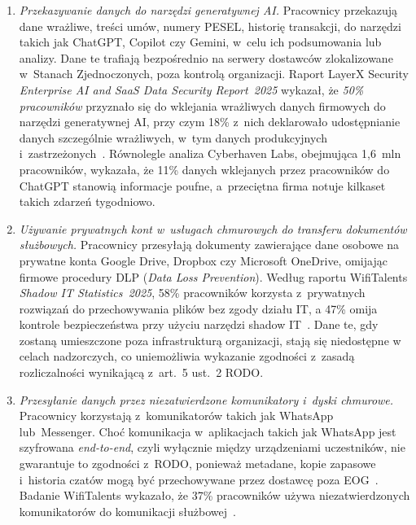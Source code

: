 \begin{enumerate}[label=(\roman*)]

\item \textit{Przekazywanie danych do narzędzi generatywnej AI.}
Pracownicy przekazują dane wrażliwe, treści umów, numery PESEL,
historię transakcji,  do narzędzi takich jak ChatGPT, Copilot czy Gemini,
w~celu ich podsumowania lub analizy. Dane te trafiają bezpośrednio na serwery
dostawców zlokalizowane w~Stanach Zjednoczonych, poza kontrolą organizacji.
Raport LayerX Security \textit{Enterprise AI and SaaS Data Security Report~2025}
wykazał, że \textit{50\% pracowników} przyznało się do wklejania wrażliwych
danych firmowych do narzędzi generatywnej AI, przy czym 18\% z~nich
deklarowało udostępnianie danych szczególnie wrażliwych, w~tym danych produkcyjnych
i~zastrzeżonych~\autocite{layerx_2025}. Równolegle analiza Cyberhaven Labs,
obejmująca 1,6~mln pracowników, wykazała, że 11\% danych
wklejanych przez pracowników do ChatGPT stanowią informacje poufne, a~przeciętna
firma notuje kilkaset takich zdarzeń tygodniowo\autocite{cyberhaven_chatgpt}.

\item \textit{Używanie prywatnych kont w~usługach chmurowych do transferu dokumentów służbowych.}
Pracownicy przesyłają dokumenty zawierające dane osobowe na prywatne konta Google Drive,
Dropbox czy Microsoft OneDrive, omijając firmowe procedury DLP
(\textit{Data Loss Prevention}). Według raportu WifiTalents \textit{Shadow IT Statistics~2025},
58\% pracowników korzysta z~prywatnych rozwiązań do przechowywania plików
bez zgody działu IT, a 47\% omija kontrole bezpieczeństwa
przy użyciu narzędzi shadow IT~\autocite{wifitalents_shadow_2025}. Dane te,
gdy zostaną umieszczone poza infrastrukturą organizacji, stają się niedostępne w celach nadzorczych, co uniemożliwia wykazanie zgodności
z~zasadą rozliczalności wynikającą z~art.~5 ust.~2 RODO.

\item \textit{Przesyłanie danych przez niezatwierdzone komunikatory i~dyski chmurowe.}
Pracownicy korzystają z~komunikatorów takich jak WhatsApp lub~Messenger.
Choć komunikacja w~aplikacjach takich jak WhatsApp jest szyfrowana \textit{end-to-end}, czyli wyłącznie między urządzeniami uczestników, nie gwarantuje to zgodności z~RODO, ponieważ metadane, kopie zapasowe i~historia czatów mogą być przechowywane przez dostawcę poza EOG~\autocite{dataprotectionpeople_human_error}. Badanie WifiTalents
wykazało, że 37\% pracowników używa niezatwierdzonych komunikatorów
do komunikacji służbowej~\autocite{wifitalents_shadow_2025}.


\end{enumerate}
